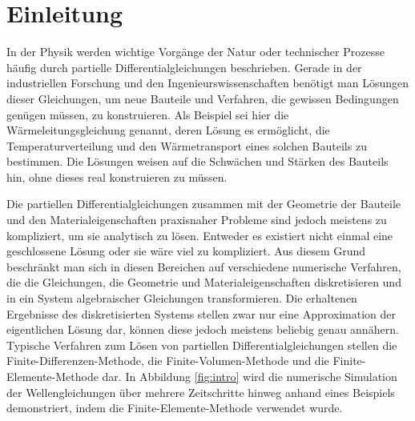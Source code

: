 \documentclass[crop=false]{standalone}
\begin{document}
  \section{Einleitung} %
  \label{sec:introduction}

    In der Physik werden wichtige Vorgänge der Natur oder technischer Prozesse häufig durch partielle Differentialgleichungen beschrieben.
    Gerade in der industriellen Forschung und den Ingenieurswissenschaften benötigt man Lösungen dieser Gleichungen, um neue Bauteile und Verfahren, die gewissen Bedingungen genügen müssen, zu konstruieren.
    Als Beispiel sei hier die Wärmeleitungsgleichung genannt, deren Lösung es ermöglicht, die Temperaturverteilung und den Wärmetransport eines solchen Bauteils zu bestimmen.
    Die Lösungen weisen auf die Schwächen und Stärken des Bauteils hin, ohne dieses real konstruieren zu müssen.
    \cite{Schweizer2013,Logan2007}

    Die partiellen Differentialgleichungen zusammen mit der Geometrie der Bauteile und den Materialeigenschaften praxisnaher Probleme sind jedoch meistens zu kompliziert, um sie analytisch zu lösen.
    Entweder es existiert nicht einmal eine geschlossene Lösung oder sie wäre viel zu kompliziert.
    Aus diesem Grund beschränkt man sich in diesen Bereichen auf verschiedene numerische Verfahren, die die Gleichungen, die Geometrie und Materialeigenschaften diskretisieren und in ein System algebraischer Gleichungen transformieren.
    Die erhaltenen Ergebnisse des diskretisierten Systems stellen zwar nur eine Approximation der eigentlichen Lösung dar, können diese jedoch meistens beliebig genau annähern.
    Typische Verfahren zum Lösen von partiellen Differentialgleichungen stellen die Finite-Differenzen-Methode, die Finite-Volumen-Methode und die Finite-Elemente-Methode dar.
    In Abbildung \ref{fig:intro} wird die numerische Simulation der Wellengleichungen über mehrere Zeitschritte hinweg anhand eines Beispiels demonstriert, indem die Finite-Elemente-Methode verwendet wurde.
    \cite{Schweizer2013,Logan2007,Cheney2008,Quarteroni2000}
\end{document}
